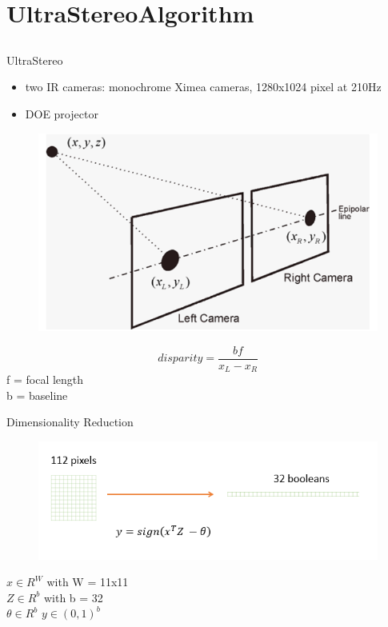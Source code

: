 %
%
\section{UltraStereoAlgorithm}
\subsection{}

\begin{frame}{UltraStereo}
\begin{itemize}
\item two IR cameras: monochrome Ximea cameras, 1280x1024 pixel at 210Hz
\item DOE projector
\end{itemize}
\end{frame}

\begin{frame}

\begin{figure}
\includegraphics[scale=0.5]{pictures/disp}
\end{figure}
\begin{equation}
disparity = \frac{bf}{x_{L}- x_{R}}
\end{equation}
f = focal length\\
b = baseline
\end{frame}

\begin{frame}{Dimensionality Reduction}
\begin{figure}
\includegraphics[scale=0.6]{pictures/patches}
\end{figure}
$ x \in R^{W} $  with W = 11x11\\
$ Z \in R^{b} $ with b = 32\\
$ \theta \in R^b$
$ y \in (0,1)^{b}$
\end{frame}

